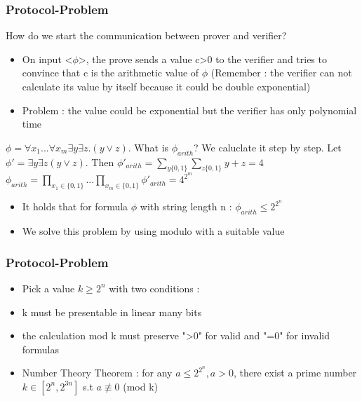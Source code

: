 \documentclass[hyperref={pdfpagelabels=false},t,10pt]{beamer}
\begin{document}
\begin{frame}
  \frametitle{Protocol-Problem}
  How do we start the communication between prover and verifier? \pause

  \begin{itemize}
    \item On input <$\phi$>, the prove sends a value c>0 to the verifier and tries to convince that c is the arithmetic value of $\phi$ \newline (Remember : the verifier can not calculate its value by itself because it could be double exponential) \pause
    \item Problem : the value could be exponential but the verifier has only polynomial time \pause
  \end{itemize}

  $\phi = \forall x_1 ... \forall x_m \exists y \exists z. (y \lor z)$. What is $\phi_{arith}$? We caluclate it step by step. \pause
  Let $\phi' = \exists y \exists z (y \lor z)$. Then $\phi'_{arith} = \sum_{y \{0,1\}}^{} \sum_{z \{0,1\}^{}} y + z = 4$ \pause
  $\phi_{arith} = \prod_{x_1 \in \{0,1\}}^{}... \prod_{x_m \in \{0,1\}}^{} \phi'_{arith} = 4^{2^{m}}$ \newline
  \begin{itemize}
    \item It holds that for formula $\phi$ with string length n : $\phi_{arith} \leq 2^{2^{n}}$
    \item  We solve this problem by using modulo with a suitable value
  \end{itemize}
\end{frame}

\begin{frame}
  \frametitle{Protocol-Problem}
  \begin{itemize}
    \item Pick a value $k \geq 2^n$ with two conditions : 
    \item k must be presentable in linear many bits \pause
    \item the calculation mod k must preserve ">0" for valid and "=0" for invalid formulas
    \item Number Theory Theorem : for any $a \leq 2^{2^{n}}, a>0$, there exist a prime number $k \in [2^n, 2^{3n}]$ s.t $a \not\equiv 0 $ (mod k)
  \end{itemize}
\end{frame}
\end{document}
